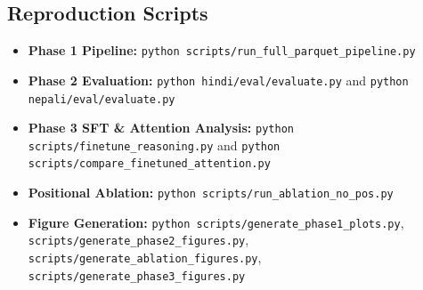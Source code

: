 \documentclass[10pt,a4paper]{article}
\begin{document}
\subsection{Reproduction Scripts}
\begin{itemize}
    \item \textbf{Phase 1 Pipeline:} \texttt{python scripts/run\_full\_parquet\_pipeline.py}
    \item \textbf{Phase 2 Evaluation:} \texttt{python hindi/eval/evaluate.py} and \texttt{python nepali/eval/evaluate.py}
    \item \textbf{Phase 3 SFT \& Attention Analysis:} \texttt{python scripts/finetune\_reasoning.py} and \linebreak \texttt{python scripts/compare\_finetuned\_attention.py}
    \item \textbf{Positional Ablation:} \texttt{python scripts/run\_ablation\_no\_pos.py}
    \item \textbf{Figure Generation:} \texttt{python scripts/generate\_phase1\_plots.py}, \texttt{scripts/generate\_phase2\_figures.py}, \linebreak \texttt{scripts/generate\_ablation\_figures.py}, \texttt{scripts/generate\_phase3\_figures.py}
\end{itemize}
\end{document}
